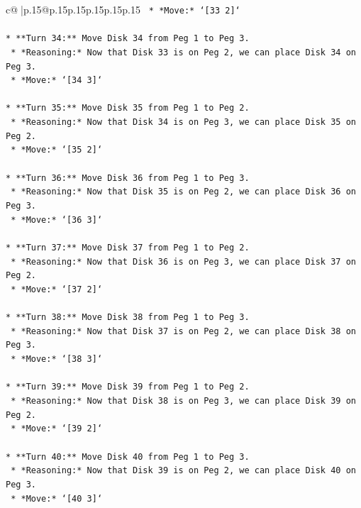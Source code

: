 \documentclass{article}
\begin{document}
{\begin{supertabular}{c@{$\;$}|p{.15\linewidth}@{}p{.15\linewidth}p{.15\linewidth}p{.15\linewidth}p{.15\linewidth}p{.15\linewidth}}
{{{\texttt{    *   *Move:* `{[}33 2{]}`} \\
\\ 
\texttt{*   **Turn 34:** Move Disk 34 from Peg 1 to Peg 3.} \\
\texttt{    *   *Reasoning:* Now that Disk 33 is on Peg 2, we can place Disk 34 on Peg 3.} \\
\texttt{    *   *Move:* `{[}34 3{]}`} \\
\\ 
\texttt{*   **Turn 35:** Move Disk 35 from Peg 1 to Peg 2.} \\
\texttt{    *   *Reasoning:* Now that Disk 34 is on Peg 3, we can place Disk 35 on Peg 2.} \\
\texttt{    *   *Move:* `{[}35 2{]}`} \\
\\ 
\texttt{*   **Turn 36:** Move Disk 36 from Peg 1 to Peg 3.} \\
\texttt{    *   *Reasoning:* Now that Disk 35 is on Peg 2, we can place Disk 36 on Peg 3.} \\
\texttt{    *   *Move:* `{[}36 3{]}`} \\
\\ 
\texttt{*   **Turn 37:** Move Disk 37 from Peg 1 to Peg 2.} \\
\texttt{    *   *Reasoning:* Now that Disk 36 is on Peg 3, we can place Disk 37 on Peg 2.} \\
\texttt{    *   *Move:* `{[}37 2{]}`} \\
\\ 
\texttt{*   **Turn 38:** Move Disk 38 from Peg 1 to Peg 3.} \\
\texttt{    *   *Reasoning:* Now that Disk 37 is on Peg 2, we can place Disk 38 on Peg 3.} \\
\texttt{    *   *Move:* `{[}38 3{]}`} \\
\\ 
\texttt{*   **Turn 39:** Move Disk 39 from Peg 1 to Peg 2.} \\
\texttt{    *   *Reasoning:* Now that Disk 38 is on Peg 3, we can place Disk 39 on Peg 2.} \\
\texttt{    *   *Move:* `{[}39 2{]}`} \\
\\ 
\texttt{*   **Turn 40:** Move Disk 40 from Peg 1 to Peg 3.} \\
\texttt{    *   *Reasoning:* Now that Disk 39 is on Peg 2, we can place Disk 40 on Peg 3.} \\
\texttt{    *   *Move:* `{[}40 3{]}`} \\
}}}
\end{supertabular}}
\end{document}

